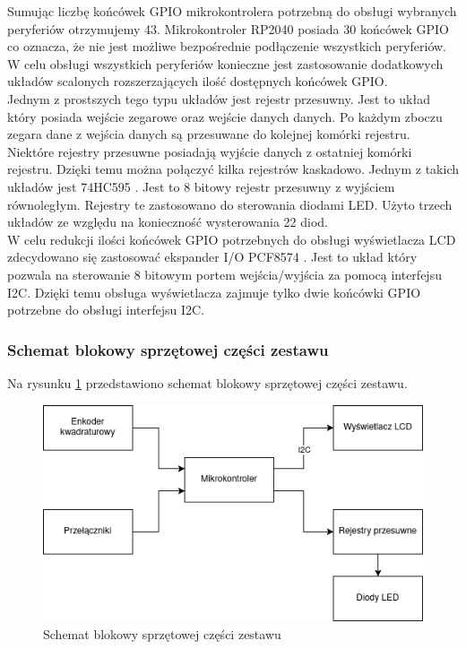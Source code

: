 \documentclass[../main.tex]{subfiles}
\begin{document}
    Sumując liczbę końcówek GPIO mikrokontrolera potrzebną do obsługi wybranych peryferiów otrzymujemy 43. 
    Mikrokontroler RP2040 posiada 30 końcówek GPIO \cite{rp:rp2040} co oznacza, że nie jest możliwe bezpośrednie podłączenie wszystkich peryferiów.
    W celu obsługi wszystkich peryferiów konieczne jest zastosowanie dodatkowych układów scalonych rozszerzających ilość dostępnych końcówek GPIO.
    \\
    Jednym z prostszych tego typu układów jest rejestr przesuwny. Jest to układ który posiada wejście zegarowe oraz wejście danych
    danych. Po każdym zboczu zegara dane z wejścia danych są przesuwane do kolejnej komórki rejestru. Niektóre rejestry przesuwne 
    posiadają wyjście danych z ostatniej komórki rejestru. Dzięki temu można połączyć kilka rejestrów kaskadowo. Jednym z takich układów jest
    74HC595 \cite{ti:74hc595}. Jest to 8 bitowy rejestr przesuwny z wyjściem równoległym. Rejestry te zastosowano do sterowania diodami LED. Użyto trzech
    układów ze względu na konieczność wysterowania 22 diod.
    \\
    W celu redukcji ilości końcówek GPIO potrzebnych do obsługi wyświetlacza LCD zdecydowano się zastosować ekspander I/O PCF8574 \cite{ti:pcf8574}.
    Jest to układ który pozwala na sterowanie 8 bitowym portem wejścia/wyjścia za pomocą interfejsu I2C. Dzięki temu obsługa wyświetlacza 
    zajmuje tylko dwie końcówki GPIO potrzebne do obsługi interfejsu I2C. 

    \subsubsection{Schemat blokowy sprzętowej części zestawu}

    Na rysunku \ref{fig:hardware_diagram} przedstawiono schemat blokowy sprzętowej części zestawu.
    
    \begin{figure}[H]
        \centering
        \includegraphics[width=\linewidth]{hardware_diagram.png}
        \caption{Schemat blokowy sprzętowej części zestawu}
        \label{fig:hardware_diagram}
    \end{figure}
    
\end{document}
